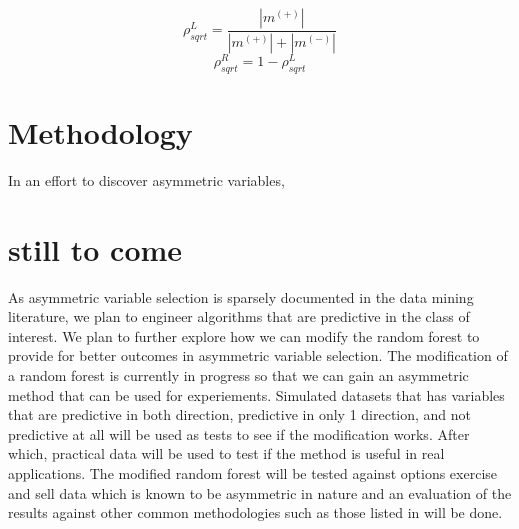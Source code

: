  \begin{equation}\label{eqn:rho_sqrt}
	\rho_{sqrt}^L = \frac{|m^{(+)}|}{|m^{(+)}|+|m^{(-)}|}
\end{equation}
\begin{equation}
	\rho_{sqrt}^R = 1- \rho_{sqrt}^L
\end{equation}

\section{Methodology}
In an effort to discover asymmetric variables, 



\section{still to come}
As asymmetric variable selection is sparsely documented in the data mining literature, we plan to engineer algorithms that are predictive in the class of interest. We plan to further explore how we can modify the random forest to provide for better outcomes in asymmetric variable selection. The modification of a random forest is currently in progress so that we can gain an asymmetric method that can be used for experiements. Simulated datasets that has variables that are predictive in both direction, predictive in only 1 direction, and not predictive at all will be used as tests to see if the modification works. After which, practical data will be used to test if the method is useful in real applications. The modified random forest will be tested against options exercise and sell data which is known to be asymmetric in nature and an evaluation of the results against other common methodologies such as those listed in \citet{Berk2011} will be done.




	

